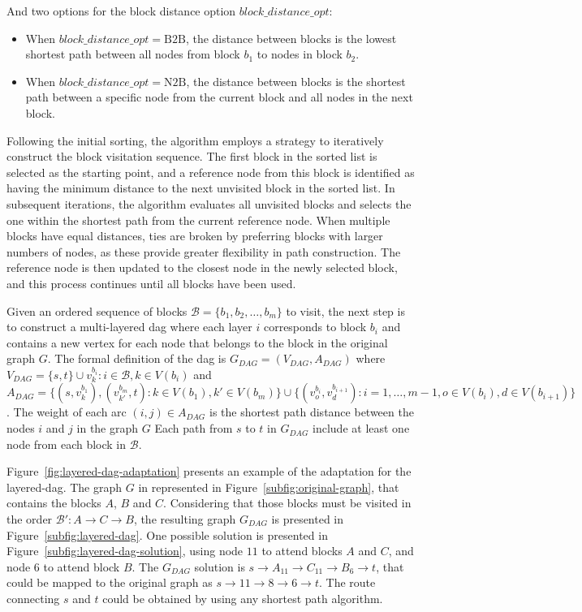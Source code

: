 And two options for the block distance option $block\_distance\_opt$:
\begin{itemize}
	\item When $block\_distance\_opt = \text{B2B}$, the distance between blocks is the lowest shortest path between all nodes from block $b_1$ to nodes in block $b_2$.
	\item When $block\_distance\_opt = \text{N2B}$, the distance between blocks is the shortest path between a specific node from the current block and all nodes in the next block.
\end{itemize}

Following the initial sorting, the algorithm employs a strategy to iteratively construct the block visitation sequence. The first block in the sorted list is selected as the starting point, and a reference node from this block is identified as having the minimum distance to the next unvisited block in the sorted list. In subsequent iterations, the algorithm evaluates all unvisited blocks and selects the one within the shortest path from the current reference node. When multiple blocks have equal distances, ties are broken by preferring blocks with larger numbers of nodes, as these provide greater flexibility in path construction. The reference node is then updated to the closest node in the newly selected block, and this process continues until all blocks have been used.

Given an ordered sequence of blocks $\mathcal{B} = \{b_1, b_2, \ldots, b_m\}$ to visit, the next step is to construct a multi-layered \gls{dag} where each layer $i$ corresponds to block $b_i$ and contains a new vertex for each node that belongs to the block in the original graph $G$. The formal definition of the \gls{dag} is $G_{DAG} = (V_{DAG}, A_{DAG})$ where $V_{DAG} = \{s, t\} \cup v^{b_i}_k: i \in \mathcal{B}, k \in V(b_i)$ and $A_{DAG} = \{(s, v^{b_1}_{k}), (v^{b_m}_{k'}, t): k \in V(b_1), k' \in V(b_m)\} \cup \{(v^{b_i}_o, v^{b_{i+1}}_{d}): i = 1, \ldots, m-1, o \in V(b_i), d \in V(b_{i+1})\}$.  The weight of each arc $(i, j) \in A_{DAG}$ is the shortest path distance between the nodes $i$ and $j$ in the graph $G$ Each path from $s$ to $t$ in $G_{DAG}$ include at least one node from each block in $\mathcal{B}$.

Figure~\ref{fig:layered-dag-adaptation} presents an example of the adaptation for the layered-dag. The graph $G$ in represented in Figure~\ref{subfig:original-graph}, that contains the blocks $A$, $B$ and $C$. Considering that those blocks must be visited in the order $\mathcal{B}': A \rightarrow C \rightarrow B$, the resulting graph $G_{DAG}$ is presented in Figure~\ref{subfig:layered-dag}. One possible solution is presented in Figure~\ref{subfig:layered-dag-solution}, using node $11$ to attend blocks $A$ and $C$, and node $6$ to attend block $B$. The $G_{DAG}$ solution is $s \rightarrow A_{11} \rightarrow C_{11} \rightarrow B_{6} \rightarrow t$, that could be mapped to the original graph as $s \rightarrow 11 \rightarrow 8 \rightarrow 6 \rightarrow t$. The route connecting $s$ and $t$ could be obtained by using any shortest path algorithm.

